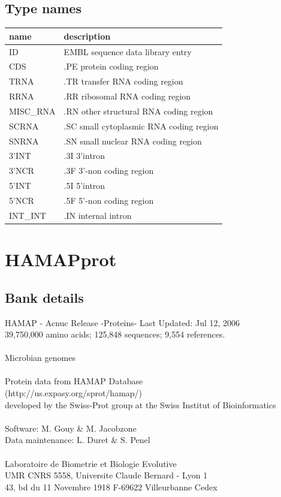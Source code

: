 \documentclass{article}
\begin{document}
\begin{Schunk}
\subsection{Type names}
\noindent\begin{tabular}{ll}
\hline \hline
name & description\\
\hline
ID & EMBL sequence data library entry \\
CDS & .PE protein coding region \\
TRNA & .TR transfer RNA coding region \\
RRNA & .RR ribosomal RNA coding region \\
MISC\_RNA & .RN other structural RNA coding region \\
SCRNA & .SC small cytoplasmic RNA coding region \\
SNRNA & .SN small nuclear RNA coding region \\
3'INT & .3I 3'intron \\
3'NCR & .3F  3'-non coding region \\
5'INT & .5I 5'intron \\
5'NCR & .5F  5'-non coding region \\
INT\_INT & .IN  internal intron \\
\hline \hline
\end{tabular}

\section{ HAMAPprot }
\subsection{Bank details}
HAMAP - Acnuc Release -Proteins- Last Updated: Jul 12, 2006\\
39,750,000 amino acids; 125,848 sequences; 9,554 references.\\
\\
Microbian genomes\\
\\
Protein data from  HAMAP Database\\
(http://us.expasy.org/sprot/hamap/)\\
developed by the Swiss-Prot group at the Swiss Institut of Bioinformatics\\
\\
Software: M. Gouy \& M. Jacobzone\\
Data maintenance: L. Duret \& S. Penel\\
\\
Laboratoire de Biometrie et Biologie Evolutive\\
UMR CNRS 5558, Universite Claude Bernard - Lyon 1\\
43, bd du 11 Novembre 1918 F-69622 Villeurbanne Cedex\\



\end{Schunk}
\end{document}
